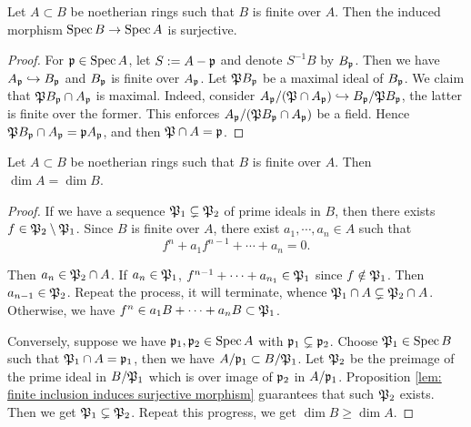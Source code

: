     \begin{lemma}\label{lem: finite inclusion induces surjective morphism}
        Let $A \subset B$ be noetherian rings such that $B$ is finite over $A$.
        Then the induced morphism $\operatorname{Spec} B \to \operatorname{Spec} A$ is surjective.
    \end{lemma}
    \begin{proof}
        For ${\mathfrak{p}} \in \operatorname{Spec} A$, let $S:= A-{\mathfrak{p}}$ and denote $S^{-1}B$ by $B_{\mathfrak{p}}$.
        Then we have $A_{\mathfrak{p}} \hookrightarrow B_{\mathfrak{p}}$ and $B_{\mathfrak{p}}$ is finite over $A_{\mathfrak{p}}$.
        Let ${\mathfrak{P}} B_{\mathfrak{p}}$ be a maximal ideal of $B_{\mathfrak{p}}$.
        We claim that ${\mathfrak{P}} B_{\mathfrak{p}} \cap A_{\mathfrak{p}}$ is maximal.
        Indeed, consider $A_{\mathfrak{p}}/({\mathfrak{P}} \cap A_{\mathfrak{p}}) \hookrightarrow B_{\mathfrak{p}}/{\mathfrak{P}} B_{\mathfrak{p}}$, the latter is finite over the former.
        This enforces $A_{\mathfrak{p}}/({\mathfrak{P}} B_{\mathfrak{p}} \cap A_{\mathfrak{p}})$ be a field.
        Hence ${\mathfrak{P}} B_{\mathfrak{p}} \cap A_{\mathfrak{p}} = {\mathfrak{p}} A_{\mathfrak{p}}$, and then ${\mathfrak{P}} \cap A = {\mathfrak{p}}$.
    \end{proof}

    \begin{proposition}\label{prop: finite morphisms preserve dimension}
        Let $A \subset B$ be noetherian rings such that $B$ is finite over $A$.
        Then $\dim A = \dim B$.
    \end{proposition}
    \begin{proof}
        If we have a sequence ${\mathfrak{P}}_1 \subsetneq {\mathfrak{P}}_2$ of prime ideals in $B$, then there exists $f \in {\mathfrak{P}}_2 \setminus {\mathfrak{P}}_1$.
        Since $B$ is finite over $A$, there exist $a_1,\cdots,a_n \in A$ such that 
        \[ f^n + a_1f^{n-1} + \cdots + a_n = 0.\]

        Then $a_n \in {\mathfrak{P}}_2 \cap A$.
        If $a_n \in {\mathfrak{P}}_1$, $f^{n-1} + \cdots + a_{n_1} \in {\mathfrak{P}}_1$ since $f \notin {\mathfrak{P}}_1$.
        Then $a_{n-1} \in {\mathfrak{P}}_2$.
        Repeat the process, it will terminate, whence ${\mathfrak{P}}_1 \cap A \subsetneq {\mathfrak{P}}_2 \cap A$.
        Otherwise, we have $f^n \in a_1 B+ \cdots + a_nB \subset {\mathfrak{P}}_1$.

        Conversely, suppose we have ${\mathfrak{p}}_1,{\mathfrak{p}}_2 \in \operatorname{Spec} A$ with ${\mathfrak{p}}_1 \subsetneq {\mathfrak{p}}_2$.
        Choose ${\mathfrak{P}}_1 \in \operatorname{Spec} B$ such that ${\mathfrak{P}}_1 \cap A = {\mathfrak{p}}_1$, then we have $A/{\mathfrak{p}}_1 \subset B/{\mathfrak{P}}_1$.
        Let ${\mathfrak{P}}_2$ be the preimage of the prime ideal in $B/{\mathfrak{P}}_1$ which is over image of ${\mathfrak{p}}_2$ in $A/{\mathfrak{p}}_1$.
        Proposition \ref{lem: finite inclusion induces surjective morphism} guarantees that such ${\mathfrak{P}}_2$ exists.
        Then we get ${\mathfrak{P}}_1 \subsetneq {\mathfrak{P}}_2$.
        Repeat this progress, we get $\dim B \geq \dim A$.
    \end{proof}

